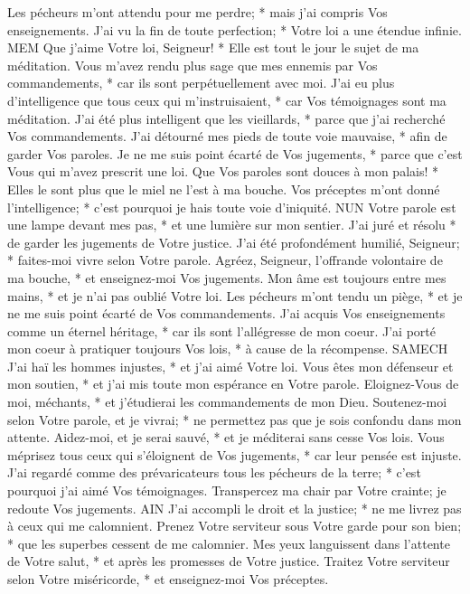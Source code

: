 Les pécheurs m'ont attendu pour me perdre; * mais j'ai compris Vos enseignements.
J'ai vu la fin de toute perfection; * Votre loi a une étendue infinie.
MEM
Que j'aime Votre loi, Seigneur! * Elle est tout le jour le sujet de ma méditation.
Vous m'avez rendu plus sage que mes ennemis par Vos commandements, * car ils sont perpétuellement avec moi.
J'ai eu plus d'intelligence que tous ceux qui m'instruisaient, * car Vos témoignages sont ma méditation.
J'ai été plus intelligent que les vieillards, * parce que j'ai recherché Vos commandements.
J'ai détourné mes pieds de toute voie mauvaise, * afin de garder Vos paroles.
Je ne me suis point écarté de Vos jugements, * parce que c'est Vous qui m'avez prescrit une loi.
Que Vos paroles sont douces à mon palais! * Elles le sont plus que le miel ne l'est à ma bouche.
Vos préceptes m'ont donné l'intelligence; * c'est pourquoi je hais toute voie d'iniquité.
NUN
Votre parole est une lampe devant mes pas, * et une lumière sur mon sentier.
J'ai juré et résolu * de garder les jugements de Votre justice.
J'ai été profondément humilié, Seigneur; * faites-moi vivre selon Votre parole.
Agréez, Seigneur, l'offrande volontaire de ma bouche, * et enseignez-moi Vos jugements.
Mon âme est toujours entre mes mains, * et je n'ai pas oublié Votre loi.
Les pécheurs m'ont tendu un piège, * et je ne me suis point écarté de Vos commandements.
J'ai acquis Vos enseignements comme un éternel héritage, * car ils sont l'allégresse de mon coeur.
J'ai porté mon coeur à pratiquer toujours Vos lois, * à cause de la récompense.
SAMECH
J'ai haï les hommes injustes, * et j'ai aimé Votre loi.
Vous êtes mon défenseur et mon soutien, * et j'ai mis toute mon espérance en Votre parole.
Eloignez-Vous de moi, méchants, * et j'étudierai les commandements de mon Dieu.
Soutenez-moi selon Votre parole, et je vivrai; * ne permettez pas que je sois confondu dans mon attente.
Aidez-moi, et je serai sauvé, * et je méditerai sans cesse Vos lois.
Vous méprisez tous ceux qui s'éloignent de Vos jugements, * car leur pensée est injuste.
J'ai regardé comme des prévaricateurs tous les pécheurs de la terre; * c'est pourquoi j'ai aimé Vos témoignages.
Transpercez ma chair par Votre crainte; je redoute Vos jugements.
AIN
J'ai accompli le droit et la justice; * ne me livrez pas à ceux qui me calomnient.
Prenez Votre serviteur sous Votre garde pour son bien; * que les superbes cessent de me calomnier.
Mes yeux languissent dans l'attente de Votre salut, * et après les promesses de Votre justice.
Traitez Votre serviteur selon Votre miséricorde, * et enseignez-moi Vos préceptes.
